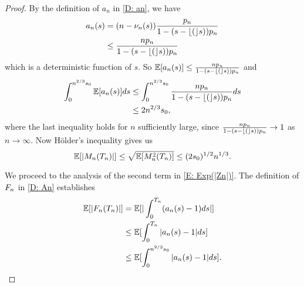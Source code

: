 \begin{proof}
    By the definition of $a_n$ in \eqref{D: an}, we have
    \begin{equation}
    \begin{aligned}
    a_n(s) &= (n - \nu_n(s)) \frac{p_n}{1 - (s - \lfloor(\rfloor s))p_n} \\
    &\leq \frac{n p_n}{1 - (s - \lfloor(\rfloor s))p_n}
    \end{aligned}
    \end{equation}
    which is a deterministic function of $s$. So
    $ \mathbb{E}[a_n(s)] \leq \frac{n p_n}{1 - (s - \lfloor(\rfloor s))p_n} $
    and
    \begin{equation}
    \begin{aligned}
    \int_{0}^{n^{2 / 3}s_0} \mathbb{E}[a_n(s)] ds 
    &\leq \int_{0}^{n^{2 / 3}s_0}\frac{n p_n}{1 - (s - \lfloor(\rfloor s))p_n}ds \\
    &\leq 2n^{2 / 3}s_0,
    \end{aligned}
    \end{equation}
    where the last inequality holds for $n$ sufficiently large, since 
    $\frac{n p_n}{1 - (s - \lfloor(\rfloor s))p_n} \rightarrow 1$
    as $n \rightarrow \infty$.
    Now Hölder's inequality gives us
    \begin{equation} \label{E: Exp(Mn)}
    \mathbb{E}[|M_n(T_n)|] \leq \sqrt{\mathbb{E}[M^2_n(T_n)]} \leq (2s_0)^{1/2}n^{1 / 3}.
    \end{equation}
    
    We proceed to the analysis of the second term in \eqref{E: Exp(|Zn|)}.
    The definition of $F_n$ in \eqref{D: An} establishes
    \begin{equation}
    \begin{aligned}
    \mathbb{E}[|F_n(T_n)|] 
    &= \mathbb{E}[|\int_{0}^{T_n}(a_n(s) -1)ds |] \\
    &\leq \mathbb{E}[\int_{0}^{T_n} |a_n(s)-1|ds] \\
    &\leq \mathbb{E}[\int_{0}^{n^{2 / 3}s_0} |a_n(s)-1|ds].
    \end{aligned}
    \end{equation}
    

\end{proof}
